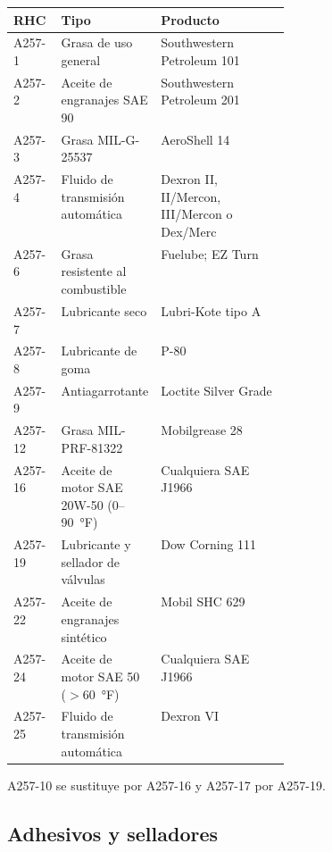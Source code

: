\begin{center}
\small
\begin{tabularx}{\linewidth}{@{}l>{\raggedright\arraybackslash}p{0.36\linewidth}>{\raggedright\arraybackslash}X@{}}
\toprule
RHC & Tipo & Producto \\
\midrule
A257-1 & Grasa de uso general & Southwestern Petroleum 101 \\
A257-2 & Aceite de engranajes SAE 90 & Southwestern Petroleum 201 \\
A257-3 & Grasa MIL-G-25537 & AeroShell 14 \\
A257-4 & Fluido de transmisión automática & Dexron II, II/Mercon, III/Mercon o Dex/Merc \\
A257-6 & Grasa resistente al combustible & Fuelube; EZ Turn \\
A257-7 & Lubricante seco & Lubri-Kote tipo A \\
A257-8 & Lubricante de goma & P-80 \\
A257-9 & Antiagarrotante & Loctite Silver Grade \\
A257-12 & Grasa MIL-PRF-81322 & Mobilgrease 28 \\
A257-16 & Aceite de motor SAE 20W-50 (0--90~°F) & Cualquiera SAE J1966 \\
A257-19 & Lubricante y sellador de válvulas & Dow Corning 111 \\
A257-22 & Aceite de engranajes sintético & Mobil SHC 629 \\
A257-24 & Aceite de motor SAE 50 ($>$60~°F) & Cualquiera SAE J1966 \\
A257-25 & Fluido de transmisión automática & Dexron VI \\
\bottomrule
\end{tabularx}
\end{center}

A257-10 se sustituye por A257-16 y A257-17 por A257-19.

\subsection{Adhesivos y selladores}

